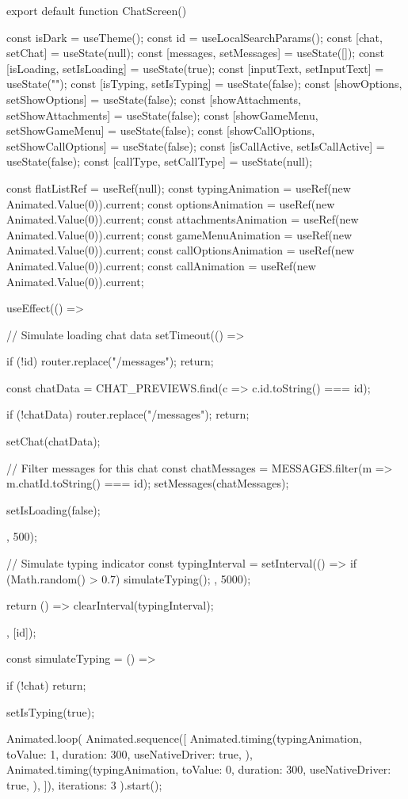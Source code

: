 export default function ChatScreen() {
  const { isDark } = useTheme();
  const { id } = useLocalSearchParams();
  const [chat, setChat] = useState(null);
  const [messages, setMessages] = useState([]);
  const [isLoading, setIsLoading] = useState(true);
  const [inputText, setInputText] = useState("");
  const [isTyping, setIsTyping] = useState(false);
  const [showOptions, setShowOptions] = useState(false);
  const [showAttachments, setShowAttachments] = useState(false);
  const [showGameMenu, setShowGameMenu] = useState(false);
  const [showCallOptions, setShowCallOptions] = useState(false);
  const [isCallActive, setIsCallActive] = useState(false);
  const [callType, setCallType] = useState(null);
  
  const flatListRef = useRef(null);
  const typingAnimation = useRef(new Animated.Value(0)).current;
  const optionsAnimation = useRef(new Animated.Value(0)).current;
  const attachmentsAnimation = useRef(new Animated.Value(0)).current;
  const gameMenuAnimation = useRef(new Animated.Value(0)).current;
  const callOptionsAnimation = useRef(new Animated.Value(0)).current;
  const callAnimation = useRef(new Animated.Value(0)).current;
  
  useEffect(() => {
    // Simulate loading chat data
    setTimeout(() => {
      if (!id) {
        router.replace("/messages");
        return;
      }
      
      const chatData = CHAT_PREVIEWS.find(c => c.id.toString() === id);
      
      if (!chatData) {
        router.replace("/messages");
        return;
      }
      
      setChat(chatData);
      
      // Filter messages for this chat
      const chatMessages = MESSAGES.filter(m => m.chatId.toString() === id);
      setMessages(chatMessages);
      
      setIsLoading(false);
    }, 500);
    
    // Simulate typing indicator
    const typingInterval = setInterval(() => {
      if (Math.random() > 0.7) {
        simulateTyping();
      }
    }, 5000);
    
    return () => clearInterval(typingInterval);
  }, [id]);
  
  const simulateTyping = () => {
    if (!chat) return;
    
    setIsTyping(true);
    
    Animated.loop(
      Animated.sequence([
        Animated.timing(typingAnimation, {
          toValue: 1,
          duration: 300,
          useNativeDriver: true,
        }),
        Animated.timing(typingAnimation, {
          toValue: 0,
          duration: 300,
          useNativeDriver: true,
        }),
      ]),
      { iterations: 3 }
    ).start();
    
}}
